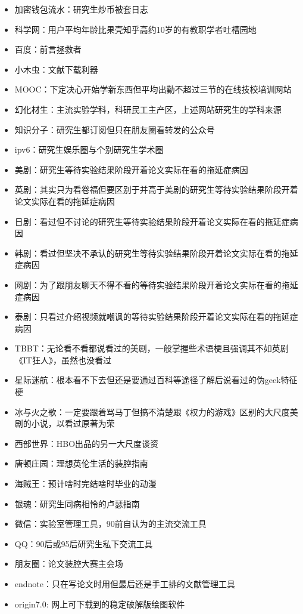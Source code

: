 \documentclass[]{tufte-book}
\begin{document}
\begin{itemize}
\item
  加密钱包流水：研究生炒币被套日志
\item
  科学网：用户平均年龄比果壳知乎高约10岁的有教职学者吐槽园地
\item
  百度：前言拯救者
\item
  小木虫：文献下载利器
\item
  MOOC：下定决心开始学新东西但平均出勤不超过三节的在线技校培训网站
\item
  幻化材生：主流实验学科，科研民工主产区，上述网站研究生的学科来源
\item
  知识分子：研究生都订阅但只在朋友圈看转发的公众号
\item
  ipv6：研究生娱乐圈与个别研究生学术圈
\item
  美剧：研究生等待实验结果阶段开着论文实际在看的拖延症病因
\item
  英剧：其实只为看卷福但要区别于并高于美剧的研究生等待实验结果阶段开着论文实际在看的拖延症病因
\item
  日剧：看过但不讨论的研究生等待实验结果阶段开着论文实际在看的拖延症病因
\item
  韩剧：看过但坚决不承认的研究生等待实验结果阶段开着论文实际在看的拖延症病因
\item
  网剧：为了跟朋友聊天不得不看的等待实验结果阶段开着论文实际在看的拖延症病因
\item
  泰剧：只看过介绍视频就嘲讽的等待实验结果阶段开着论文实际在看的拖延症病因
\item
  TBBT：无论看不看都说看过的美剧，一般掌握些术语梗且强调其不如英剧《IT狂人》，虽然也没看过
\item
  星际迷航：根本看不下去但还是要通过百科等途径了解后说看过的伪geek特征梗
\item
  冰与火之歌：一定要跟着骂马丁但搞不清楚跟《权力的游戏》区别的大尺度美剧的小说，以看过原著为荣
\item
  西部世界：HBO出品的另一大尺度谈资
\item
  唐顿庄园：理想英伦生活的装腔指南
\item
  海贼王：预计啥时完结啥时毕业的动漫
\item
  银魂：研究生同病相怜的卢瑟指南
\item
  微信：实验室管理工具，90前自认为的主流交流工具
\item
  QQ：90后或95后研究生私下交流工具
\item
  朋友圈：论文装腔大赛主会场
\item
  endnote：只在写论文时用但最后还是手工排的文献管理工具
\item
  origin7.0: 网上可下载到的稳定破解版绘图软件

\end{itemize}
\end{document}
